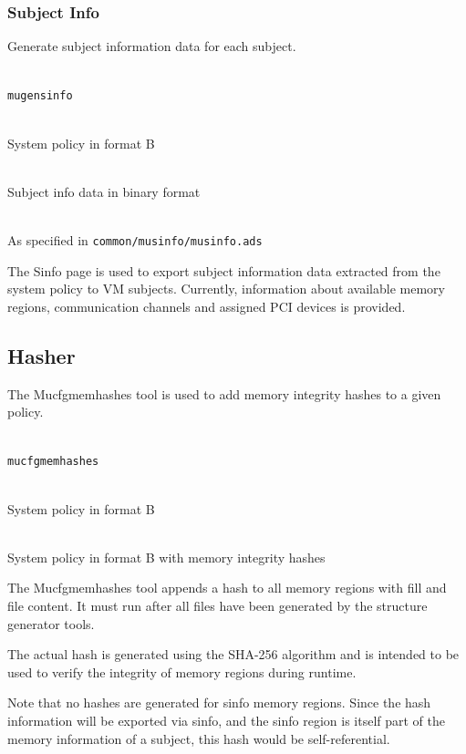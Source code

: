 \documentclass[a4paper,twoside,titlepage]{article}
\begin{document}
\subsubsection{Subject Info}
Generate subject information data for each subject.

\begin{description} \itemsep1pt \parskip0pt
	\item[Name] \hfill \\
		\texttt{mugensinfo}
	\item[Input] \hfill \\
		System policy in format B
	\item[Output] \hfill \\
		Subject info data in binary format
	\item[Output format] \hfill \\
		As specified in \texttt{common/musinfo/musinfo.ads}
\end{description}

The Sinfo page is used to export subject information data extracted from the
system policy to VM subjects. Currently, information about available memory
regions, communication channels and assigned PCI devices is provided.

\subsection{Hasher}
The Mucfgmemhashes tool is used to add memory integrity hashes to a given
policy.

\begin{description} \itemsep1pt \parskip0pt
	\item[Name] \hfill \\
		\texttt{mucfgmemhashes}
	\item[Input] \hfill \\
		System policy in format B
	\item[Output] \hfill \\
		System policy in format B with memory integrity hashes
\end{description}

The Mucfgmemhashes tool appends a hash to all memory regions with fill and file
content. It must run after all files have been generated by the structure
generator tools.

The actual hash is generated using the SHA-256 algorithm and is intended to be
used to verify the integrity of memory regions during runtime.

Note that no hashes are generated for sinfo memory regions. Since the
hash information will be exported via sinfo, and the sinfo region is
itself part of the memory information of a subject, this hash would be
self-referential.
\end{document}
